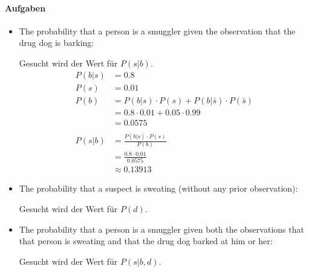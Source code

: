 \documentclass[DIV=9,numbers=noenddot]{scrartcl}
\begin{document}
		\paragraph{Aufgaben}
			\begin{itemize}
				\item The probability that a person is a smuggler given the observation that the drug dog is barking:
				\par
				Gesucht wird der Wert für $P(s|b)$.
				\begin{align*}
					P(b|s) &= 0.8
					\\P(s) &= 0.01
					\\P(b) &= P(b|s) \cdot P(s) + P(b|\bar{s}) \cdot P(\bar{s})
					\\&= 0.8 \cdot 0.01 + 0.05 \cdot 0.99
					\\&= 0.0575
					\\
					\\P(s|b) &= \frac{P(b|s) \cdot P(s)}{P(b)}
					\\&=\frac{0.8 \cdot 0.01}{0.0575}
					\\&\approx 0.13913
				\end{align*}
				\item The probability that a suspect is sweating (without any prior observation):
				\par
				Gesucht wird der Wert für $P(d)$.
				\item The probability that a person is a smuggler given both the observations that
				that person is sweating and that the drug dog barked at him or her:
				\par
				Gesucht wird der Wert für $P(s|b,d)$.
			\end{itemize}
\end{document}
